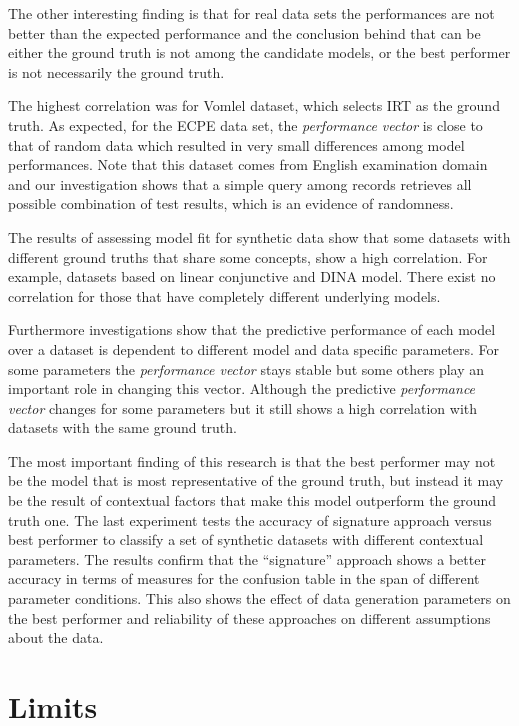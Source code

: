 The other interesting finding is that for real data sets the performances are not better than the expected performance and the conclusion behind that can be either the ground truth is not among the candidate models, or the best performer is not necessarily the ground truth. 



The highest correlation was for Vomlel dataset, which selects IRT as the ground truth. As expected, for the ECPE data set, the \textit{performance vector} is close to that of random data which resulted in very small differences among model performances. Note that this dataset comes from English examination domain and our investigation shows that a simple query among records retrieves all possible combination of test results, which is an evidence of randomness.

The results of assessing model fit for synthetic data show that some datasets with different ground truths that share some concepts, show a high correlation. For example, datasets based on linear conjunctive and DINA model. There exist no correlation for those that have completely different underlying models.

Furthermore investigations show that the predictive performance of each model over a dataset is dependent to different model and data specific parameters. For some parameters the \textit{performance vector} stays stable but some others play an important role in changing this vector. Although the predictive \textit{performance vector} changes for some parameters but it still shows a high correlation with datasets with the same ground truth.


The most important finding of this research is that the best performer may not be the model that is most representative of the ground truth, but instead it may be the result of contextual factors that make this model outperform the ground truth one. The last experiment tests the accuracy of signature approach versus best performer to classify a set of synthetic datasets with different contextual parameters. The results confirm that the ``signature'' approach shows a better accuracy in terms of measures for the confusion table in the span of different parameter conditions. This also shows the effect of data generation parameters on the best performer and reliability of these approaches on different assumptions about the data.

\section{Limits}

